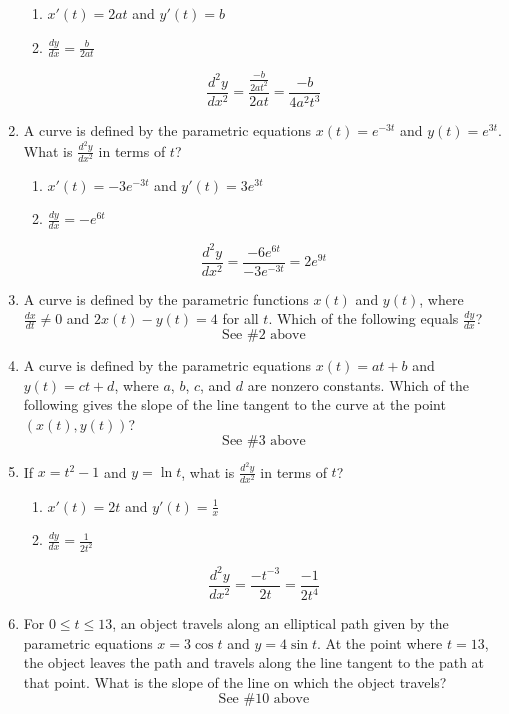\documentclass[12pt]{article}
\begin{document}
\begin{enumerate}
    \begin{enumerate}
        \item $x'(t)=2at$ and $y'(t)=b$
        \item $\frac{dy}{dx} = \frac{b}{2at}$
    \end{enumerate}
    $$\frac{d^2y}{dx^2} = \frac{\frac{-b}{2at^2}}{2at} = \boxed{\frac{-b}{4a^2t^3}}$$
    \item A curve is defined by the parametric equations $x(t)=e^{-3t}$ and $y(t)=e^{3t}$. What is $\frac{d^2y}{dx^2}$ in terms of $t$?
    \begin{enumerate}
        \item $x'(t) = -3e^{-3t}$ and $y'(t) =3e^{3t}$
        \item $\frac{dy}{dx} = -e^{6t}$
    \end{enumerate}
    $$\frac{d^2y}{dx^2} = \frac{-6e^{6t}}{-3e^{-3t}} = \boxed{2e^{9t}}$$
    \item A curve is defined by the parametric functions $x(t)$
    and $y(t)$, where $\frac{dx}{dt} \neq 0$ and $2x(t)-y(t)=4$ for all $t$. Which of the following equals $\frac{dy}{dx}$?
    $$\boxed{\text{See \#2 above}}$$
    \item A curve is defined by the parametric equations $x(t)=at+b$ and $y(t)=ct+d$, where $a$, $b$, $c$, and $d$ are nonzero constants. Which of the following gives the slope of the line tangent to the curve at the point $(x(t),y(t))$?
    $$\boxed{\text{See \#3 above}}$$
    \item If $x=t^2-1$ and $y=\ln t$, what is $\frac{d^2y}{dx^2}$ in terms of $t$?
    \begin{enumerate}
        \item $x'(t) = 2t$ and $y'(t) = \frac{1}{x}$
        \item $\frac{dy}{dx} = \frac{1}{2t^2}$
    \end{enumerate}
    $$\frac{d^2y}{dx^2} = \frac{-t^{-3}}{2t} = \boxed{\frac{-1}{2t^4}}$$
    \item For $0 \leq t \leq 13$, an object travels along an elliptical path given by the parametric equations $x=3\cos t$
    and $y=4 \sin t$. At the point where $t=13$, the object leaves the path and travels along the line tangent to the path at that point. What is the slope of the line on which the object travels?
    $$\boxed{\text{See \#10 above}}$$
\end{enumerate} 
\end{document}
